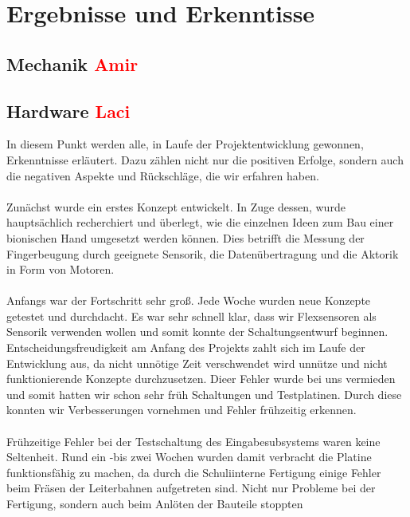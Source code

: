 \documentclass[titlepage,12pt,twoside]{article}
\begin{document}
\newpage
\section{Ergebnisse und Erkenntisse}
\label{chap:Ergebnisse und Erkenntisse}

\subsection{Mechanik \textcolor{red}{Amir}}

\subsection{Hardware \textcolor{red}{Laci}}
In diesem Punkt werden alle, in Laufe der Projektentwicklung gewonnen, Erkenntnisse erläutert. Dazu zählen nicht nur die
positiven Erfolge, sondern auch die negativen Aspekte und Rückschläge, die wir erfahren haben. \\
\\
Zunächst wurde ein erstes Konzept entwickelt. In Zuge dessen, wurde hauptsächlich recherchiert und überlegt, wie die 
einzelnen Ideen zum Bau einer bionischen Hand umgesetzt werden können. Dies betrifft die Messung der Fingerbeugung durch geeignete Sensorik, 
die Datenübertragung und die Aktorik in Form von Motoren. \\
\\
Anfangs war der Fortschritt sehr groß. Jede Woche wurden neue Konzepte getestet und durchdacht. Es war sehr schnell klar, dass wir Flexsensoren
als Sensorik verwenden wollen und somit konnte der Schaltungsentwurf beginnen. Entscheidungsfreudigkeit am Anfang des Projekts zahlt sich im Laufe der Entwicklung aus,
da nicht unnötige Zeit verschwendet wird unnütze und nicht funktionierende Konzepte durchzusetzen. Dieer Fehler wurde bei uns vermieden und somit hatten wir schon sehr früh 
Schaltungen und Testplatinen. Durch diese konnten wir Verbesserungen vornehmen und Fehler frühzeitig erkennen. \\
\\
Frühzeitige Fehler bei der Testschaltung des Eingabesubsystems waren keine Seltenheit. Rund ein -bis zwei Wochen wurden damit verbracht die Platine funktionsfähig zu machen, da 
durch die Schuliinterne Fertigung einige Fehler beim Fräsen der Leiterbahnen aufgetreten sind. Nicht nur Probleme bei der Fertigung, sondern auch beim Anlöten der Bauteile stoppten 
\end{document}
